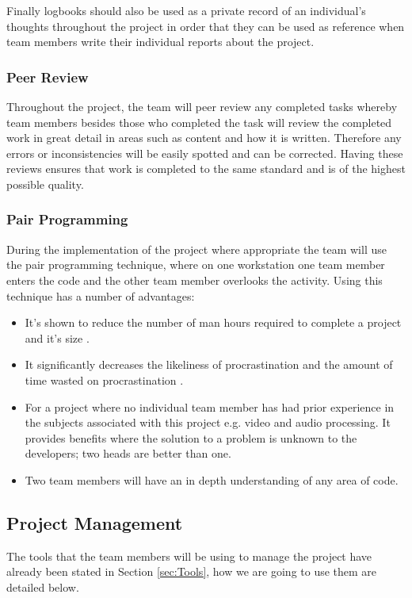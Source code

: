 Finally logbooks should also be used as a private record of an individual's thoughts throughout the project in order that they can 
be used as reference when team members write their individual reports about the project.

\subsubsection{Peer Review}
\label{PeerReview}
Throughout the project, the team will peer review any completed tasks whereby team members besides those who completed the task will 
review the completed work in great detail in areas such as content and how it is written. Therefore any errors or inconsistencies will be easily spotted and can be corrected. Having these reviews ensures that work is completed to the same standard and is of the highest possible quality.

\subsubsection{Pair Programming}
\label{PairProgramming}
During the implementation of the project where appropriate the team will use the pair programming technique, where on one workstation one 
team member enters the code and the other team member overlooks the activity. Using this technique has a number of advantages:

\begin{itemize}
	\item{It's shown to reduce the number of man hours required to complete a project and it's size \cite{citePairProgramming}.}
	\item{It significantly decreases the likeliness of procrastination and the amount of time wasted on procrastination \cite{citeIlluminatedPair}.}
	\item{For a project where no individual team member has had prior experience in the subjects associated with this project e.g. video and audio processing. It provides benefits where the solution to a problem is unknown to the developers; two heads are better than one.}
	\item{Two team members will have an in depth understanding of any area of code.}
\end{itemize}

\subsection{Project Management}
The tools that the team members will be using to manage the project have already been stated in Section \ref{sec:Tools}, how we are going to use them are detailed below.

